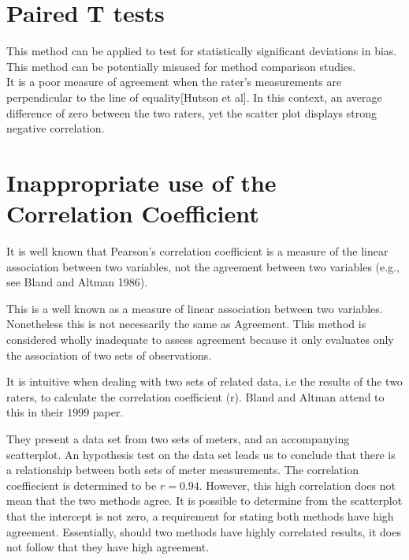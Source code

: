 \documentclass[12pt, a4paper]{report}
\theoremstyle{plain}
\theoremstyle{definition}
\theoremstyle{remark}
\begin{document}
	
	


			\section{Paired T tests} This method can be applied to test for
			statistically significant deviations in bias. This method can be
			potentially misused for method comparison studies.
			\\It is a poor measure of agreement when the rater's measurements
			are perpendicular to the line of equality[Hutson et al]. In this
			context, an average difference of zero between the two raters, yet
			the scatter plot displays strong negative correlation.
			
			
	\section{Inappropriate use of the Correlation Coefficient}
It is well known that Pearson's correlation coefficient is a measure of the linear 		association between two variables, not the agreement between two variables (e.g., see Bland and Altman 1986).

This is a well known as a measure of linear association between two	variables. Nonetheless this is not necessarily the same as Agreement. This method is considered wholly inadequate to assess
		agreement because it only evaluates only the association of two sets of observations.
		
		
	It is intuitive when dealing with two sets of related data, i.e
	the results of the two raters, to calculate the correlation
	coefficient (r). Bland and Altman attend to this in their $1999$
	paper.
	
	They present a data set from two sets of meters, and an
	accompanying scatterplot. An hypothesis test on the data set leads
	us to conclude that there is a relationship between both sets of
	meter measurements. The correlation coeffiecient is determined to
	be $r =0.94 $. However, this high correlation does not mean that the
	two methods agree. It is possible to determine from the
	scatterplot that the intercept is not zero, a requirement for
	stating both methods have high agreement. Essentially, should two
	methods have highly correlated results, it does not follow that
	they have high agreement.
	
\end{document}
